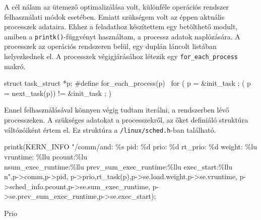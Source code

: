 A cél nálam az ütemező optimalizálása volt, különféle operációs rendszer felhasználati módok esetében. Emiatt szükségem volt az éppen aktuális processzek adataira.
Ehhez a feladathoz készítettem egy betölthető modult, amiben a \texttt{printk()}-függvényt használtam, a processz adatok naplózására.
A processzek az operációs rendszeren belül, egy duplán láncolt listában helyezkednek el.
A processzek végigjárásához létezik egy \texttt{for\_each\_process} makró.
\begin{cpp}
struct task_struct *p;
#define for_each_process(p) \
	 for ( p = &init_task ; ( p = next_task(p)) != &init_task ; )
\end{cpp}
Ennel felhasználásával könnyen végig tudtam iterálni, a rendszerben lévő processzeken. A szükséges adatokat a processzekről, az őket definiáló struktúra váltózóiként értem el. Ez struktúra a \texttt{/linux/sched.h}-ban található.
\begin{cpp}
 printk(KERN_INFO "/comm/and: \%s pid: \%d 
 prio: \%d rt_prio: \%d weight: \%lu 
 vruntime: \%llu pcount:\%lu 
 \\nsum_exec_runtime:\%llu 
 prev_sum_exec_runtime:\%llu 
 exec_start:\%llu\\n",p->comm,p->pid, 
 p->prio,rt_task(p),p->se.load.weight,p->se.vruntime,
 p->sched_info.pcount,p->se.sum_exec_runtime,
 p->se.prev_sum_exec_runtime,p->se.exec_start);
\end{cpp}

Prio
